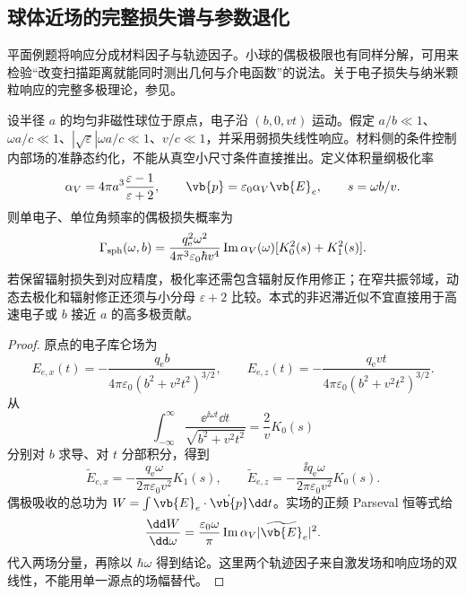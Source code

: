 \subsection{球体近场的完整损失谱与参数退化}

平面例题将响应分成材料因子与轨迹因子。小球的偶极极限也有同样分解，可用来检验“改变扫描距离就能同时测出几何与介电函数”的说法。关于电子损失与纳米颗粒响应的完整多极理论，参见\cite{GarciaDeAbajo2010RMP}。

\begin{proposition}
设半径 $a$ 的均匀非磁性球位于原点，电子沿 $(b,0,vt)$ 运动。假定 $a/b\ll1$、$\omega a/c\ll1$、$|\sqrt\varepsilon|\omega a/c\ll1$、$v/c\ll1$，并采用弱损失线性响应。材料侧的条件控制内部场的准静态约化，不能从真空小尺寸条件直接推出。定义体积量纲极化率
\[
\alpha_V=4\pi a^3\frac{\varepsilon-1}{\varepsilon+2},
\qquad\vb{p}=\varepsilon_0\alpha_V\vb{E}_e,
\qquad s=\omega b/v.
\]
则单电子、单位角频率的偶极损失概率为
\begin{equation}
{\Gamma_{\rm sph}(\omega,b)
=\frac{q_{\mathrm e}^2\omega^2}{4\pi^3\varepsilon_0\hbar v^4}
\operatorname{Im}\alpha_V(\omega)
[K_0^2(s)+K_1^2(s)].}
\label{eq:feqo-sphere-eels-dipole}
\end{equation}
若保留辐射损失到对应精度，极化率还需包含辐射反作用修正；在窄共振邻域，动态去极化和辐射修正还须与小分母 $\varepsilon+2$ 比较。本式的非迟滞近似不宜直接用于高速电子或 $b$ 接近 $a$ 的高多极贡献。
\end{proposition}
\begin{proof}
原点的电子库仑场为
\[
E_{e,x}(t)=-\frac{q_{\mathrm e}b}{4\pi\varepsilon_0(b^2+v^2t^2)^{3/2}},
\qquad
E_{e,z}(t)=-\frac{q_{\mathrm e}vt}{4\pi\varepsilon_0(b^2+v^2t^2)^{3/2}}.
\]
从
\[
\int_{-\infty}^{\infty}\frac{\ee^{\ii\omega t}\dd t}{\sqrt{b^2+v^2t^2}}
=\frac2vK_0(s)
\]
分别对 $b$ 求导、对 $t$ 分部积分，得到
\[
\widetilde E_{e,x}=-\frac{q_{\mathrm e}\omega}{2\pi\varepsilon_0v^2}K_1(s),
\qquad
\widetilde E_{e,z}=-\frac{\ii q_{\mathrm e}\omega}{2\pi\varepsilon_0v^2}K_0(s).
\]
偶极吸收的总功为 $W=\int\vb{E}_e\cdot\dot{\vb{p}}\dd t$。实场的正频 Parseval 恒等式给
\[
\frac{\dd W}{\dd\omega}
=\frac{\varepsilon_0\omega}{\pi}
\operatorname{Im}\alpha_V|\widetilde{\vb{E}}_e|^2.
\]
代入两场分量，再除以 $\hbar\omega$ 得到结论。这里两个轨迹因子来自激发场和响应场的双线性，不能用单一源点的场幅替代。
\end{proof}

